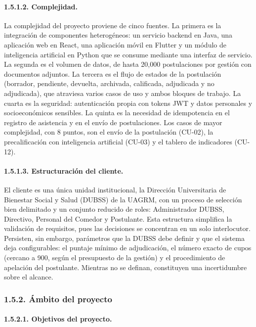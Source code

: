 \paragraph{1.5.1.2. Complejidad.}

La complejidad del proyecto proviene de cinco fuentes. La primera es la integración de componentes heterogéneos: un servicio backend en Java, una aplicación web en React, una aplicación móvil en Flutter y un módulo de inteligencia artificial en Python que se consume mediante una interfaz de servicio. La segunda es el volumen de datos, de hasta 20,000 postulaciones por gestión con documentos adjuntos. La tercera es el flujo de estados de la postulación (borrador, pendiente, devuelta, archivada, calificada, adjudicada y no adjudicada), que atraviesa varios casos de uso y ambos bloques de trabajo. La cuarta es la seguridad: autenticación propia con tokens JWT y datos personales y socioeconómicos sensibles. La quinta es la necesidad de idempotencia en el registro de asistencia y en el envío de postulaciones. Los casos de mayor complejidad, con 8 puntos, son el envío de la postulación (CU-02), la precalificación con inteligencia artificial (CU-03) y el tablero de indicadores (CU-12).

\paragraph{1.5.1.3. Estructuración del cliente.}

El cliente es una única unidad institucional, la Dirección Universitaria de Bienestar Social y Salud (DUBSS) de la UAGRM, con un proceso de selección bien delimitado y un conjunto reducido de roles: Administrador DUBSS, Directivo, Personal del Comedor y Postulante. Esta estructura simplifica la validación de requisitos, pues las decisiones se concentran en un solo interlocutor. Persisten, sin embargo, parámetros que la DUBSS debe definir y que el sistema deja configurables: el puntaje mínimo de adjudicación, el número exacto de cupos (cercano a 900, según el presupuesto de la gestión) y el procedimiento de apelación del postulante. Mientras no se definan, constituyen una incertidumbre sobre el alcance.

\subsubsection{1.5.2. Ámbito del proyecto}

\paragraph{1.5.2.1. Objetivos del proyecto.}

